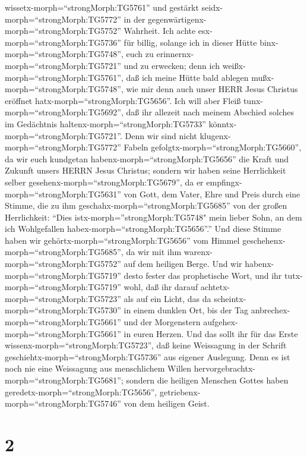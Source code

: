 wissetx-morph=``strongMorph:TG5761'' und gestärkt
seidx-morph=``strongMorph:TG5772'' in der
gegenwärtigenx-morph=``strongMorph:TG5752'' Wahrheit.  Ich
achte esx-morph=``strongMorph:TG5736'' für billig, solange ich in dieser
Hütte binx-morph=``strongMorph:TG5748'', euch zu
erinnernx-morph=``strongMorph:TG5721'' und zu erwecken; 
denn ich weißx-morph=``strongMorph:TG5761'', daß ich meine Hütte bald
ablegen mußx-morph=``strongMorph:TG5748'', wie mir denn auch unser HERR
Jesus Christus eröffnet hatx-morph=``strongMorph:TG5656''. 
Ich will aber Fleiß tunx-morph=``strongMorph:TG5692'', daß ihr allezeit
nach meinem Abschied solches im Gedächtnis
haltenx-morph=``strongMorph:TG5733''
könntx-morph=``strongMorph:TG5721''.  Denn wir sind nicht
klugenx-morph=``strongMorph:TG5772'' Fabeln
gefolgtx-morph=``strongMorph:TG5660'', da wir euch kundgetan
habenx-morph=``strongMorph:TG5656'' die Kraft und Zukunft unsers HERRN
Jesus Christus; sondern wir haben seine Herrlichkeit selber
gesehenx-morph=``strongMorph:TG5679'',  da er
empfingx-morph=``strongMorph:TG5631'' von Gott, dem Vater, Ehre und
Preis durch eine Stimme, die zu ihm
geschahx-morph=``strongMorph:TG5685'' von der großen Herrlichkeit:
``Dies istx-morph=''strongMorph:TG5748" mein lieber Sohn, an dem ich
Wohlgefallen habex-morph=``strongMorph:TG5656''.''  Und
diese Stimme haben wir gehörtx-morph=``strongMorph:TG5656'' vom Himmel
geschehenx-morph=``strongMorph:TG5685'', da wir mit ihm
warenx-morph=``strongMorph:TG5752'' auf dem heiligen Berge.
 Und wir habenx-morph=``strongMorph:TG5719'' desto fester
das prophetische Wort, und ihr tutx-morph=``strongMorph:TG5719'' wohl,
daß ihr darauf achtetx-morph=``strongMorph:TG5723'' als auf ein Licht,
das da scheintx-morph=``strongMorph:TG5730'' in einem dunklen Ort, bis
der Tag anbrechex-morph=``strongMorph:TG5661'' und der Morgenstern
aufgehex-morph=``strongMorph:TG5661'' in euren Herzen.  Und
das sollt ihr für das Erste wissenx-morph=``strongMorph:TG5723'', daß
keine Weissagung in der Schrift geschiehtx-morph=``strongMorph:TG5736''
aus eigener Auslegung.  Denn es ist noch nie eine
Weissagung aus menschlichem Willen
hervorgebrachtx-morph=``strongMorph:TG5681''; sondern die heiligen
Menschen Gottes haben geredetx-morph=``strongMorph:TG5656'',
getriebenx-morph=``strongMorph:TG5746'' von dem heiligen Geist.

\hypertarget{section-1}{%
\section{2}\label{section-1}}

